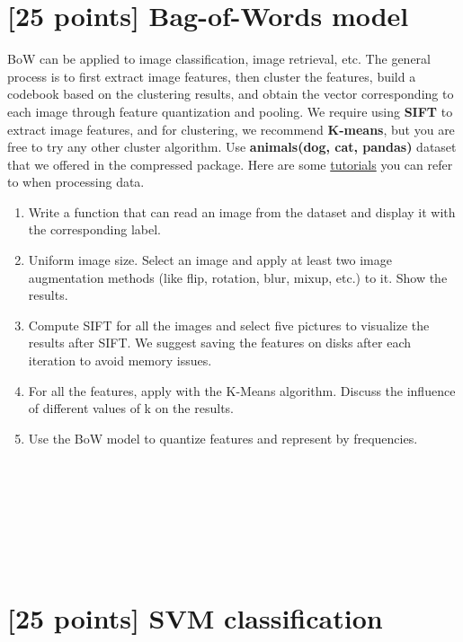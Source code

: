 \documentclass[]{article}
\begin{document}
\newpage


\section{[25 points] Bag-of-Words model}
BoW can be applied to image classification, image retrieval, etc. The general process is to first extract image features, then cluster the features, build a codebook based on the clustering results, and obtain the vector corresponding to each image through feature quantization and pooling. We require using \textbf{SIFT} to extract image features, and for clustering, we recommend \textbf{K-means}, but you are free to try any other cluster algorithm. Use \textbf{animals(dog, cat, pandas)} dataset that we offered in the compressed package. Here are some \href{https://www.kaggle.com/code/bygbrains/dog-cat-pandas-image-classifier}{tutorials} you can refer to when processing data.
\begin{enumerate} 

    \item Write a function that can read an image from the dataset and display it with the corresponding label. 
    
    \item Uniform image size. Select an image and apply at least two image augmentation methods (like flip, rotation, blur, mixup, etc.) to it. Show the results. 
    \item Compute SIFT for all the images and select five pictures to visualize the results after SIFT. We suggest saving the features on disks after each iteration to avoid memory issues. 
    \item For all the features, apply with the K-Means algorithm. Discuss the influence of different values of k on the results.
    \item Use the BoW model to quantize features and represent by frequencies.
    
\end{enumerate}

~\\
~\\
~\\
~\\
~\\
~ \\

\section{[25 points] SVM classification}
\end{document}
